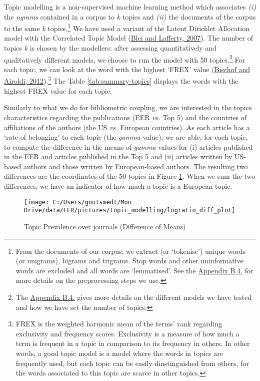 \documentclass[]{elsarticle} %
\begin{document}
Topic modelling is a non-supervised machine learning method which
associates \emph{(i)} the \emph{ngrams} contained in a corpus to
\emph{k} topics and \emph{(ii)} the documents of the corpus to the same
\emph{k} topics.\footnote{From the documents of our corpus, we extract
  (or `tokenise') unique words (or unigrams), bigrams and trigrams. Stop
  words and other uninformative words are excluded and all words are
  `lemmatised'. See the \protect\hyperlink{topic}{Appendix B.4.} for
  more details on the preprocessing steps we use.} We have used a
variant of the Latent Dirichlet Allocation model with the Correlated
Topic Model (\protect\hyperlink{ref-blei2007}{Blei and Lafferty, 2007}).
The number of topics \emph{k} is chosen by the modellers: after
assessing quantitatively and qualitatively different models, we choose
to run the model with 50 topics.\footnote{The
  \protect\hyperlink{topic}{Appendix B.4.} gives more details on the
  different models we have tested and how we have set the number of
  topics.} For each topic, we can look at the word with the highest
`FREX' value (\protect\hyperlink{ref-bischof2012}{Bischof and Airoldi,
2012}).\footnote{FREX is the weighted harmonic mean of the terms' rank
  regarding exclusivity and frequency scores. Exclusivity is a measure
  of how much a term is frequent in a topic in comparison to its
  frequency in others. In other words, a good topic model is a model
  where the words in topics are frequently used, but each topic can be
  easily dinstinguished from others, for the words associated to this
  topic are scarce in other topics.} The Table \ref{tab:summary-topics}
displays the words with the highest FREX value for each topic.

Similarly to what we do for bibliometric coupling, we are interested in
the topics characteristics regarding the publications (EER \emph{vs.}
Top 5) and the countries of affiliations of the authors (the US
\emph{vs.} European countries). As each article has a `rate of
belonging' to each topic (the \emph{gamma} value), we are able, for each
topic, to compute the difference in the means of \emph{gamma} values for
(i) articles published in the EER and articles published in the Top 5
and (ii) articles written by US-based authors and those written by
European-based authors. The resulting two differences are the
coordinates of the 50 topics in Figure \ref{fig:plot-topic-diff}. When
we sum the two differences, we have an indicator of how much a topic is
a European topic.

\begin{figure}[h]

{\centering \texttt{[image: C:/Users/goutsmedt/Mon Drive/data/EER/pictures/topic\_modelling/logratio\_diff\_plot]} 

}

\caption{Topic Prevalence over journals (Difference of Means)}\label{fig:plot-topic-diff}
\end{figure}
\end{document}
